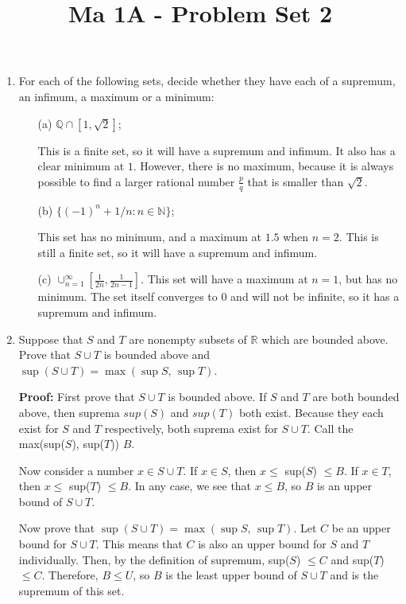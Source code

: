 \documentclass[11pt]{article}
\title{\vspace{-0.7cm}Ma 1A - Problem Set 2}
\date{}
\begin{document}
\maketitle

\begin{enumerate}

\item
For each of the following sets, decide whether they have each of a supremum, an infimum, a maximum or a minimum:
\begin{itemize}
\item[(a)] $\mathbb{Q} \cap [1, \sqrt{2}]$;

\bigskip
This is a finite set, so it will have a supremum and infimum. It also has a clear minimum at $1$. However, there is no maximum, because it is always possible to find a larger rational number $\frac{p}{q}$ that is smaller than $\sqrt{2}$. 

\item[(b)] $\{(-1)^n + 1/n : n \in \mathbb{N}\}$;

\bigskip
This set has no minimum, and a maximum at $1.5$ when $n=2$. This is still a finite set, so it will have a supremum and infimum. 

\item[(c)] $\cup_{n=1}^\infty [\frac{1}{2n}, \frac{1}{2n-1}]$.
This set will have a maximum at $n = 1$, but has no minimum. The set itself converges to $0$ and will not be infinite, so it has a supremum and infimum. 
\end{itemize}

\item
Suppose that $S$ and $T$ are nonempty subsets of $\mathbb{R}$ which are bounded above. Prove that $S \cup T$ is bounded above and $\sup (S\cup T) = \max(\sup S, \, \sup T)$.

\bigskip
\textbf{Proof: } First prove that $S \cup T$ is bounded above. If $S$ and $T$ are both bounded above, then suprema $sup(S)$ and $sup(T)$ both exist. Because they each exist for $S$ and $T$ respectively, both suprema exist for $S \cup T$. Call the max(sup($S$), sup($T$)) $B$. 

\medskip
Now consider a number $x \in S\cup T$. If $x \in S$, then $x \leq $ sup($S$) $\leq B$. If $x \in T$, then $x \leq $ sup($T$) $\leq B$. In any case, we see that $x \leq B$, so $B$ is an upper bound of $S\cup T$. 

\medskip Now prove that $\sup (S\cup T) = \max(\sup S, \, \sup T)$. Let $ C $ be an upper bound for $S\cup T$. This means that $C$ is also an upper bound for $S$ and $T$ individually. Then, by the definition of supremum, sup($S$) $\leq C$ and sup($T$) $\leq C$. Therefore, $B \leq U$, so $B$ is the least upper bound of $S\cup T$ and is the supremum of this set. 


\end{enumerate}
\end{document}

